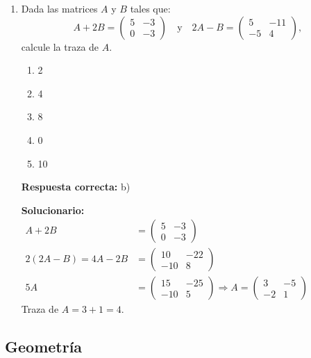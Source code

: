\begin{enumerate}
	
	\item Dada las matrices $A$ y $B$ tales que:
	\[
	A+2B=\begin{pmatrix} 5 & -3\\ 0 & -3\end{pmatrix}
	\quad \text{y}\quad
	2A-B=\begin{pmatrix} 5 & -11\\ -5 & 4\end{pmatrix},
	\]
	calcule la traza de $A$.
	
	\begin{enumerate}[label=\alph*)]
		\item 2
		\item 4
		\item 8
		\item 0
		\item 10
	\end{enumerate}
	
	\textbf{Respuesta correcta:} b)
	
	\vspace{2mm}
	\textbf{Solucionario:}\\
	$
	\begin{aligned}
		A+2B &= \begin{pmatrix}5 & -3\\ 0 & -3\end{pmatrix}\\
		2(2A-B) = 4A-2B &= \begin{pmatrix}10 & -22\\ -10 & 8\end{pmatrix}\\
		5A &= \begin{pmatrix}15 & -25\\ -10 & 5\end{pmatrix}
		\Rightarrow
		A = \begin{pmatrix}3 & -5\\ -2 & 1\end{pmatrix}
	\end{aligned}
	$
	\\
	Traza de $A = 3+1=4$.
	
	
	
	
\end{enumerate}






\subsection*{Geometría}

